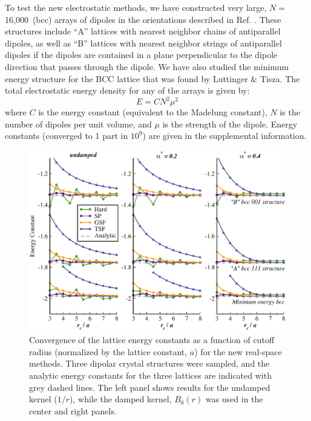To test the new electrostatic methods, we have constructed very large,
$N=$ 16,000~(bcc) arrays of dipoles in the orientations described in
Ref. \cite{LT}.  These structures include ``A'' lattices with
nearest neighbor chains of antiparallel dipoles, as well as ``B''
lattices with nearest neighbor strings of antiparallel dipoles if the
dipoles are contained in a plane perpendicular to the dipole direction
that passes through the dipole.  We have also studied the minimum
energy structure for the BCC lattice that was found by Luttinger \&
Tisza.  The total electrostatic energy density for any of the arrays
is given by:
\begin{equation}
  E = C N^2 \mu^2
\end{equation}
where $C$ is the energy constant (equivalent to the Madelung
constant), $N$ is the number of dipoles per unit volume, and $\mu$ is
the strength of the dipole. Energy constants (converged to 1 part in
$10^9$) are given in the supplemental information.\cite{supplemental}
\begin{figure}[tpb]
  \begin{center}
    \centerline{\includegraphics[width = \linewidth]{Dipoles_rcut_threeAlpha.pdf}}
    \caption{Convergence of the lattice energy constants as a function of
  cutoff radius (normalized by the lattice constant, $a$) for the new
  real-space methods.  Three dipolar crystal structures were sampled,
  and the analytic energy constants for the three lattices are
  indicated with grey dashed lines.  The left panel shows results for
  the undamped kernel ($1/r$), while the damped kernel, $B_0(r)$ was
  used in the center and right panels.}
\label{fig:Dipoles_rCut}
  \end{center}
\end{figure}

